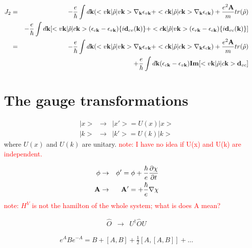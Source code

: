 \documentclass[aps,prb,preprint]{revtex4-1}
\begin{document}
\begin{appendix}
\begin{eqnarray}
J_{2} &=&  -\frac{e}{\hbar} \int d{\bf k} (<v{\bf k}|\hat{\rho}|v{\bf k}> \nabla_{\bf k} \epsilon_{v{\bf k}} +<c{\bf k}|\hat{\rho}|c{\bf k}> \nabla_{\bf k} \epsilon_{c{\bf k}} ) + \frac{e^2{\bf A}}{m}tr(\hat{\rho}) \nonumber \\
&& -\frac{e}{\hbar} \int d{\bf k} [ <v{\bf k}|\hat{\rho}|c{\bf k}> (\epsilon_{c{\bf k}}-\epsilon_{v{\bf k}}) \{i {\bf d}_{cv}({\bf k})\} + <c{\bf k}|\hat{\rho}|v{\bf k}> (\epsilon_{v{\bf k}}-\epsilon_{c{\bf k}}) \{i {\bf d}_{vc}({\bf k})\} ]  \nonumber \\
&=&  -\frac{e}{\hbar} \int d{\bf k} (<v{\bf k}|\hat{\rho}|v{\bf k}> \nabla_{\bf k} \epsilon_{v{\bf k}} +<c{\bf k}|\hat{\rho}|c{\bf k}> \nabla_{\bf k} \epsilon_{c{\bf k}} ) + \frac{e^2{\bf A}}{m}tr(\hat{\rho}) \nonumber \\
&& + \frac{e}{\hbar} \int d{\bf k} (\epsilon_{c{\bf k}}-\epsilon_{v{\bf k}}) {\bf Im}[ <v{\bf k}|\hat{\rho}|c{\bf k}>{\bf d}_{vc} ]  
\end{eqnarray} 
\newpage


\section{The gauge transformations}
\begin{eqnarray}
|x> &\rightarrow& |x'> = U(x) |x> \\
|k> &\rightarrow& |k'> = U(k) |k>
\end{eqnarray} 
where $U(x)$ and $U(k)$ are unitary.
\textcolor{red}{note: I have no idea if U(x) and U(k) are independent. }

\begin{eqnarray}
\phi &\rightarrow& \phi' = \phi +\frac{\hbar}{e} \frac{\partial \chi}{\partial t} \\
{\bf A} &\rightarrow& {\bf A}' = +\frac{\hbar}{e} {\bf \nabla} \chi
\end{eqnarray} 
\textcolor{red}{note: $H^V$ is not the hamilton of the whole system; what is does A mean?}

\begin{eqnarray}
\hat{O} &\rightarrow& U^{\dag} \hat{O} U \nonumber 
\end{eqnarray} 

\begin{eqnarray}
e^A B e^{-A} = B+ [A,B] +\frac{1}{2}[A,[A,B]] + ... \nonumber  
\end{eqnarray} 


\end{appendix}
\end{document}
